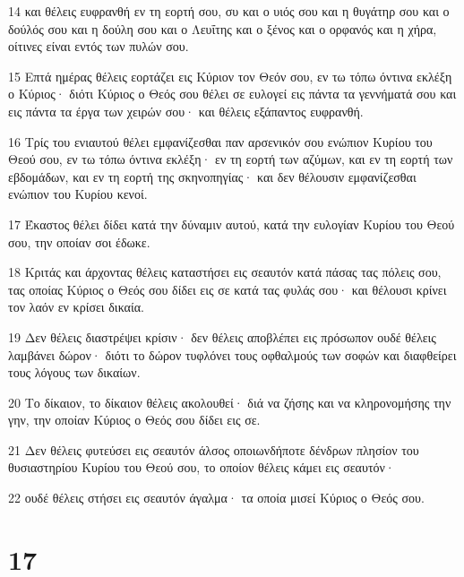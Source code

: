 \par 14 και θέλεις ευφρανθή εν τη εορτή σου, συ και ο υιός σου και η θυγάτηρ σου και ο δούλός σου και η δούλη σου και ο Λευΐτης και ο ξένος και ο ορφανός και η χήρα, οίτινες είναι εντός των πυλών σου.
\par 15 Επτά ημέρας θέλεις εορτάζει εις Κύριον τον Θεόν σου, εν τω τόπω όντινα εκλέξη ο Κύριος· διότι Κύριος ο Θεός σου θέλει σε ευλογεί εις πάντα τα γεννήματά σου και εις πάντα τα έργα των χειρών σου· και θέλεις εξάπαντος ευφρανθή.
\par 16 Τρίς του ενιαυτού θέλει εμφανίζεσθαι παν αρσενικόν σου ενώπιον Κυρίου του Θεού σου, εν τω τόπω όντινα εκλέξη· εν τη εορτή των αζύμων, και εν τη εορτή των εβδομάδων, και εν τη εορτή της σκηνοπηγίας· και δεν θέλουσιν εμφανίζεσθαι ενώπιον του Κυρίου κενοί.
\par 17 Έκαστος θέλει δίδει κατά την δύναμιν αυτού, κατά την ευλογίαν Κυρίου του Θεού σου, την οποίαν σοι έδωκε.
\par 18 Κριτάς και άρχοντας θέλεις καταστήσει εις σεαυτόν κατά πάσας τας πόλεις σου, τας οποίας Κύριος ο Θεός σου δίδει εις σε κατά τας φυλάς σου· και θέλουσι κρίνει τον λαόν εν κρίσει δικαία.
\par 19 Δεν θέλεις διαστρέψει κρίσιν· δεν θέλεις αποβλέπει εις πρόσωπον ουδέ θέλεις λαμβάνει δώρον· διότι το δώρον τυφλόνει τους οφθαλμούς των σοφών και διαφθείρει τους λόγους των δικαίων.
\par 20 Το δίκαιον, το δίκαιον θέλεις ακολουθεί· διά να ζήσης και να κληρονομήσης την γην, την οποίαν Κύριος ο Θεός σου δίδει εις σε.
\par 21 Δεν θέλεις φυτεύσει εις σεαυτόν άλσος οποιωνδήποτε δένδρων πλησίον του θυσιαστηρίου Κυρίου του Θεού σου, το οποίον θέλεις κάμει εις σεαυτόν·
\par 22 ουδέ θέλεις στήσει εις σεαυτόν άγαλμα· τα οποία μισεί Κύριος ο Θεός σου.

\chapter{17}

